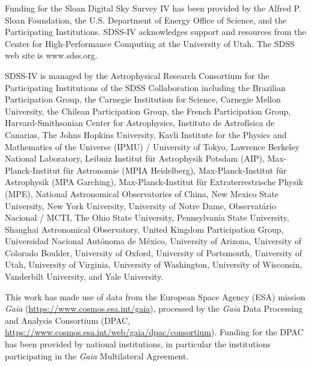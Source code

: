 Funding for the Sloan Digital Sky Survey IV has been provided by the Alfred P.
Sloan Foundation, the U.S. Department of Energy Office of Science, and the
Participating Institutions. SDSS-IV acknowledges support and resources from the
Center for High-Performance Computing at the University of Utah. The SDSS web
site is www.sdss.org.

SDSS-IV is managed by the Astrophysical Research Consortium for the
Participating Institutions of the SDSS Collaboration including the Brazilian
Participation Group, the Carnegie Institution for Science, Carnegie Mellon
University, the Chilean Participation Group, the French Participation Group,
Harvard-Smithsonian Center for Astrophysics, Instituto de Astrof\'isica de
Canarias, The Johns Hopkins University, Kavli Institute for the Physics and
Mathematics of the Universe (IPMU) / University of Tokyo, Lawrence Berkeley
National Laboratory, Leibniz Institut f\"ur Astrophysik Potsdam (AIP),
Max-Planck-Institut f\"ur Astronomie (MPIA Heidelberg), Max-Planck-Institut
f\"ur Astrophysik (MPA Garching), Max-Planck-Institut f\"ur Extraterrestrische
Physik (MPE), National Astronomical Observatories of China, New Mexico State
University, New York University, University of Notre Dame, Observat\'ario
Nacional / MCTI, The Ohio State University, Pennsylvania State University,
Shanghai Astronomical Observatory, United Kingdom Participation Group,
Universidad Nacional Aut\'onoma de M\'exico, University of Arizona, University
of Colorado Boulder, University of Oxford, University of Portsmouth, University
of Utah, University of Virginia, University of Washington, University of
Wisconsin, Vanderbilt University, and Yale University.

This work has made use of data from the European Space Agency (ESA) mission
{\it Gaia} (\url{https://www.cosmos.esa.int/gaia}), processed by the {\it Gaia}
Data Processing and Analysis Consortium (DPAC,
\url{https://www.cosmos.esa.int/web/gaia/dpac/consortium}). Funding for the DPAC
has been provided by national institutions, in particular the institutions
participating in the {\it Gaia} Multilateral Agreement.



